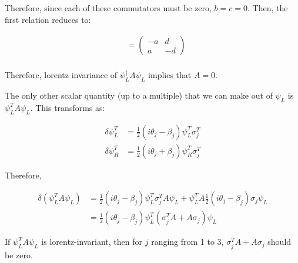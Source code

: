 \documentclass{article}
\begin{document}
Therefore, since each of these commutators must be zero, $b = c = 0$.
Then, the first relation reduces to:

\begin{align*}
[ \sigma_1 , A ] 
& = \left( \begin{matrix} - a & d  \\ a & - d\end{matrix} \right)\\
\end{align*}

Therefore, lorentz invariance of $\psi_L^\dagger A \psi_L$ implies that $A = 0$.

The only other scalar quantity (up to a multiple) that we can make out of $\psi_L$ is
	$\psi_L^T A \psi_L$.
This transforms as:

\begin{align}
\delta \psi_L^T & = \frac12 (i \theta_j - \beta_j) \psi_L^T \sigma_j^T\\
\delta \psi_R^T & = \frac12 (i \theta_j + \beta_j) \psi_R^T \sigma_j^T
\end{align}

Therefore,

\begin{align}
\delta (\psi_L^T A \psi_L)
	& = \frac12 (i \theta_j - \beta_j) \psi_L^T \sigma_j^T A \psi_L
	+ \psi_L^T A \frac12 ( i \theta_j - \beta_j) \sigma_j \psi_L \nonumber \\
	& = \frac12(i \theta_j - \beta_j) \psi_L^T (\sigma_j^T A + A \sigma_j) \psi_L
\end{align}

If $\psi_L^T A \psi_L$ is lorentz-invariant, then for $j$ ranging from 1 to 3,
	$\sigma_j^T A + A \sigma_j$ should be zero.
\end{document}

